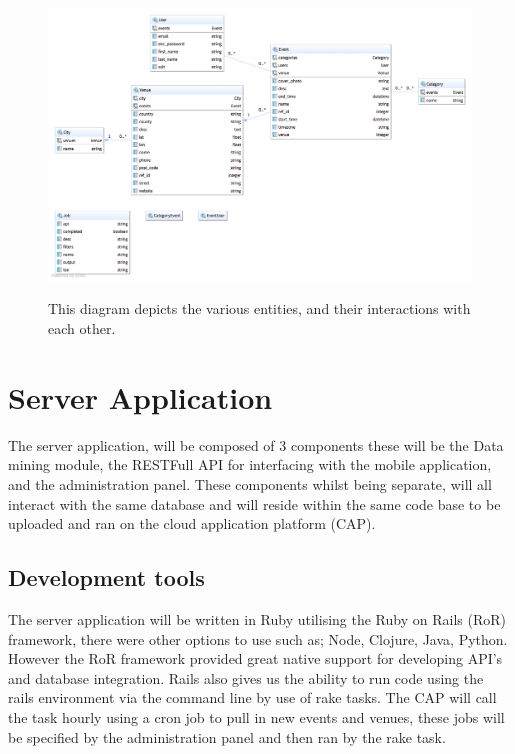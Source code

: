 		\begin{figure}[ht] %
			\caption[Entity Relationship Diagram]{This diagram depicts the various entities, and their interactions with each other.}
			\centering
			\includegraphics[width=1\textwidth,angle=90]{Images/ERD}
			\label{fig:erd}
		\end{figure}

	\section{Server Application}
		The server application, will be composed of 3 components these will be the Data mining module, the RESTFull API for interfacing with the mobile application, and the administration panel. These components whilst being separate, will all interact with the same database and will reside within the same code base to be uploaded and ran on the cloud application platform (CAP).

		\subsection{Development tools}
			The server application will be written in Ruby utilising the Ruby on Rails (RoR) framework, there were other options to use such as; Node, Clojure, Java, Python. However the RoR framework provided great native support for developing API's and database integration. Rails also gives us the ability to run code using the rails environment via the command line by use of rake tasks. The CAP will call the task hourly using a cron job to pull in new events and venues, these jobs will be specified by the administration panel and then ran by the rake task. 

